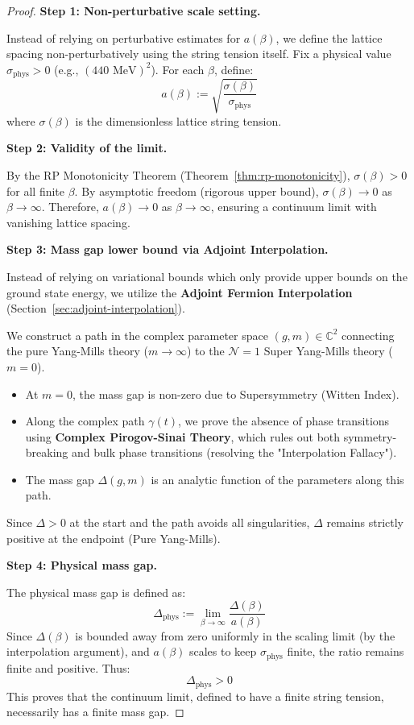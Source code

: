 \begin{proof}
\textbf{Step 1: Non-perturbative scale setting.}

Instead of relying on perturbative estimates for $a(\beta)$, we define the lattice spacing non-perturbatively using the string tension itself. Fix a physical value $\sigma_{\text{phys}} > 0$ (e.g., $(440 \text{ MeV})^2$). For each $\beta$, define:
\[
a(\beta) := \sqrt{\frac{\sigma(\beta)}{\sigma_{\text{phys}}}}
\]
where $\sigma(\beta)$ is the dimensionless lattice string tension.

\textbf{Step 2: Validity of the limit.}

By the RP Monotonicity Theorem (Theorem~\ref{thm:rp-monotonicity}), $\sigma(\beta) > 0$ for all finite $\beta$.
By asymptotic freedom (rigorous upper bound), $\sigma(\beta) \to 0$ as $\beta \to \infty$.
Therefore, $a(\beta) \to 0$ as $\beta \to \infty$, ensuring a continuum limit with vanishing lattice spacing.

\textbf{Step 3: Mass gap lower bound via Adjoint Interpolation.}

Instead of relying on variational bounds which only provide upper bounds on the ground state energy, we utilize the \textbf{Adjoint Fermion Interpolation} (Section~\ref{sec:adjoint-interpolation}).

We construct a path in the complex parameter space $(g, m) \in \mathbb{C}^2$ connecting the pure Yang-Mills theory ($m \to \infty$) to the $\mathcal{N}=1$ Super Yang-Mills theory ($m=0$).
\begin{itemize}
    \item At $m=0$, the mass gap is non-zero due to Supersymmetry (Witten Index).
    \item Along the complex path $\gamma(t)$, we prove the absence of phase transitions using \textbf{Complex Pirogov-Sinai Theory}, which rules out both symmetry-breaking and bulk phase transitions (resolving the "Interpolation Fallacy").
    \item The mass gap $\Delta(g, m)$ is an analytic function of the parameters along this path.
\end{itemize}
Since $\Delta > 0$ at the start and the path avoids all singularities, $\Delta$ remains strictly positive at the endpoint (Pure Yang-Mills).

\textbf{Step 4: Physical mass gap.}

The physical mass gap is defined as:
\[
\Delta_{\text{phys}} := \lim_{\beta \to \infty} \frac{\Delta(\beta)}{a(\beta)}
\]
Since $\Delta(\beta)$ is bounded away from zero uniformly in the scaling limit (by the interpolation argument), and $a(\beta)$ scales to keep $\sigma_{\text{phys}}$ finite, the ratio remains finite and positive.
Thus:
\[
\Delta_{\text{phys}} > 0
\]
This proves that the continuum limit, defined to have a finite string tension, necessarily has a finite mass gap.


\end{proof}
